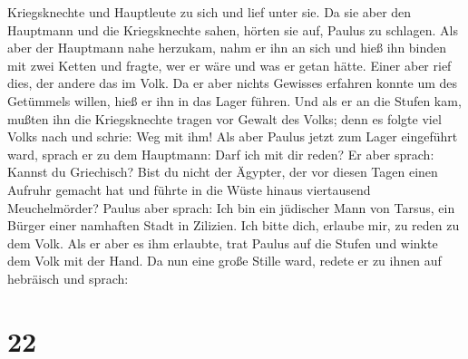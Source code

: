 Kriegsknechte und Hauptleute zu sich und lief unter sie. Da sie aber den
Hauptmann und die Kriegsknechte sahen, hörten sie auf, Paulus zu
schlagen.  Als aber der Hauptmann nahe herzukam, nahm er
ihn an sich und hieß ihn binden mit zwei Ketten und fragte, wer er wäre
und was er getan hätte.  Einer aber rief dies, der andere
das im Volk. Da er aber nichts Gewisses erfahren konnte um des Getümmels
willen, hieß er ihn in das Lager führen.  Und als er an die
Stufen kam, mußten ihn die Kriegsknechte tragen vor Gewalt des Volks;
 denn es folgte viel Volks nach und schrie: Weg mit ihm!
 Als aber Paulus jetzt zum Lager eingeführt ward, sprach er
zu dem Hauptmann: Darf ich mit dir reden? Er aber sprach: Kannst du
Griechisch?  Bist du nicht der Ägypter, der vor diesen
Tagen einen Aufruhr gemacht hat und führte in die Wüste hinaus
viertausend Meuchelmörder?  Paulus aber sprach: Ich bin ein
jüdischer Mann von Tarsus, ein Bürger einer namhaften Stadt in Zilizien.
Ich bitte dich, erlaube mir, zu reden zu dem Volk.  Als er
aber es ihm erlaubte, trat Paulus auf die Stufen und winkte dem Volk mit
der Hand. Da nun eine große Stille ward, redete er zu ihnen auf
hebräisch und sprach:

\hypertarget{section-21}{%
\section{22}\label{section-21}}

